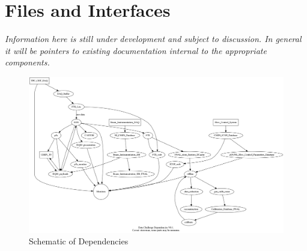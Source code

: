 \documentclass[pdftex,12pt,letter]{article}
\begin{document}

\clearpage

\appendix
\section{Files and Interfaces}
\emph{Information here is still under development and subject to discussion. In general it will be pointers to existing documentation  internal to the appropriate components. }
\\ 

\begin{figure}[tbh]
  \centering
  \includegraphics[width=1.0\textwidth]{../figures/dc1_integration.png}
  \caption{Schematic of Dependencies}
  \label{fig:dependencies}
\end{figure}
\end{document}

